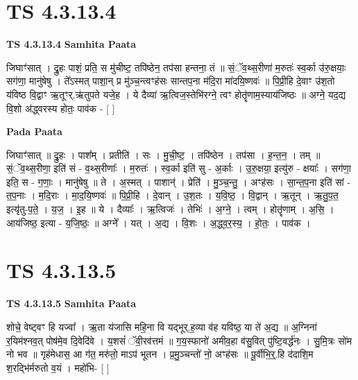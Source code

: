 \documentclass[17pt]{extarticle}
\begin{document}
\section*{ TS 4.3.13.4 }

\textbf{TS 4.3.13.4 } \newline
\textbf{Samhita Paata} \newline

जिघाꣳ॑सात् । द्रु॒हः पाशं॒ प्रति॒ स मु॑चीष्ट॒ तपि॑ष्ठेन॒ तप॑सा हन्तना॒ तं ॥ सं॒ॅव॒थ्स॒रीणा॑ म॒रुतः॑ स्व॒र्का उ॑रु॒क्षयाः॒ सग॑णा॒ मानु॑षेषु । ते᳚ऽस्मत् पाशा॒न् प्र मु॑ञ्च॒न्त्वꣳह॑सः सान्तप॒ना म॑दि॒रा मा॑दयि॒ष्णवः॑ ॥ पि॒प्री॒हि दे॒वाꣳ उ॑श॒तो य॑विष्ठ वि॒द्वाꣳ ऋ॒तूꣳर्.ऋ॑तुपते यजे॒ह । ये दैव्या॑ ऋ॒त्विज॒स्तेभि॑रग्ने॒ त्वꣳ होतॄ॑णाम॒स्याय॑जिष्ठः ॥ अग्ने॒ यद॒द्य वि॒शो अ॑द्ध्वरस्य होतः॒ पाव॑क - [  ] \newline

\textbf{Pada Paata} \newline

जिघाꣳ॑सात् ॥ द्रु॒हः । पाश᳚म् । प्रतीति॑ । सः । मु॒ची॒ष्ट॒ । तपि॑ष्ठेन । तप॑सा । ह॒न्त॒न॒ । तम् ॥ सं॒ॅव॒थ्स॒रीणा॒ इति॑ सं - व॒थ्स॒रीणाः᳚ । म॒रुतः॑ । स्व॒र्का इति॑ सु - अ॒र्काः । उ॒रु॒क्षया॒ इत्यु॑रु - क्षयाः᳚ । सग॑णा॒ इति॒ स - ग॒णाः॒ । मानु॑षेषु ॥ ते । अ॒स्मत् । पाशान्॑ । प्रेति॑ । मु॒ञ्च॒न्तु॒ । अꣳह॑सः । सा॒न्त॒प॒ना इति॑ सां - त॒प॒नाः । म॒दि॒राः । मा॒द॒यि॒ष्णवः॑ ॥ पि॒प्री॒हि । दे॒वान् । उ॒श॒तः । य॒वि॒ष्ठ॒ । वि॒द्वान् । ऋ॒तून् । ऋ॒तु॒प॒त॒ इत्यृ॑तु-प॒ते॒ । य॒ज॒ । इ॒ह ॥ ये । दैव्याः᳚ । ऋ॒त्विजः॑ । तेभिः॑ । अ॒ग्ने॒ । त्वम् । होतॄ॑णाम् । अ॒सि॒ । आय॑जिष्ठ॒ इत्या - य॒जि॒ष्ठः॒ ॥ अग्ने᳚ । यत् । अ॒द्य । वि॒शः । अ॒द्ध्व॒र॒स्य॒ । हो॒तः॒ । पाव॑क ।  \newline




\section*{ TS 4.3.13.5 }

\textbf{TS 4.3.13.5 } \newline
\textbf{Samhita Paata} \newline

शोचे॒ वेष्ट्वꣳ हि यज्वा᳚ । ऋ॒ता य॑जासि महि॒ना वि यद्भूर्.ह॒व्या व॑ह यविष्ठ॒ या ते॑ अ॒द्य ॥ अ॒ग्निना॑ र॒यिम॑श्नव॒त् पोष॑मे॒व दि॒वेदि॑वे । य॒शसं॑ ॅवी॒रव॑त्तमं ॥ ग॒य॒स्फानो॑ अमीव॒हा व॑सु॒वित् पु॑ष्टि॒वर्द्ध॑नः । सु॒मि॒त्रः सो॑म नो भव ॥ गृह॑मेधास॒ आ ग॑त॒ मरु॑तो॒ माऽप॑ भूतन । प्र॒मु॒ञ्चन्तो॑ नो॒ अꣳह॑सः ॥ पू॒र्वीभि॒र्॒.हि द॑दाशि॒म श॒रद्भि॑र्मरुतो व॒यं । महो॑भि- [  ] \newline
\end{document}

